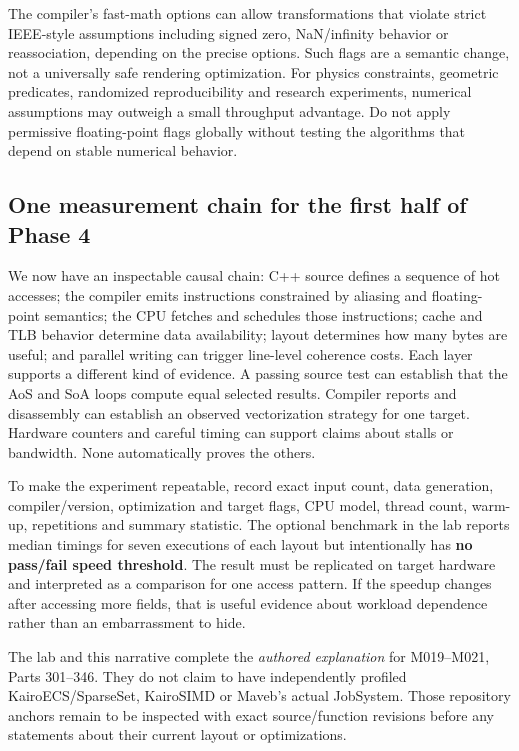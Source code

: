 The compiler's fast-math options can allow transformations that violate strict IEEE-style assumptions including signed zero, NaN/infinity behavior or reassociation, depending on the precise options. Such flags are a semantic change, not a universally safe rendering optimization. For physics constraints, geometric predicates, randomized reproducibility and research experiments, numerical assumptions may outweigh a small throughput advantage. Do not apply permissive floating-point flags globally without testing the algorithms that depend on stable numerical behavior.

\subsection{One measurement chain for the first half of Phase 4}\label{05-engine-i-ch007-one-measurement-chain-for-the-first-half-of-phase-4}

We now have an inspectable causal chain: C++ source defines a sequence of hot accesses; the compiler emits instructions constrained by aliasing and floating-point semantics; the CPU fetches and schedules those instructions; cache and TLB behavior determine data availability; layout determines how many bytes are useful; and parallel writing can trigger line-level coherence costs. Each layer supports a different kind of evidence. A passing source test can establish that the AoS and SoA loops compute equal selected results. Compiler reports and disassembly can establish an observed vectorization strategy for one target. Hardware counters and careful timing can support claims about stalls or bandwidth. None automatically proves the others.

To make the experiment repeatable, record exact input count, data generation, compiler/version, optimization and target flags, CPU model, thread count, warm-up, repetitions and summary statistic. The optional benchmark in the lab reports median timings for seven executions of each layout but intentionally has \textbf{no pass/fail speed threshold}. The result must be replicated on target hardware and interpreted as a comparison for one access pattern. If the speedup changes after accessing more fields, that is useful evidence about workload dependence rather than an embarrassment to hide.

The lab and this narrative complete the \emph{authored explanation} for M019--M021, Parts 301--346. They do not claim to have independently profiled KairoECS/SparseSet, KairoSIMD or Maveb's actual JobSystem. Those repository anchors remain to be inspected with exact source/function revisions before any statements about their current layout or optimizations.

